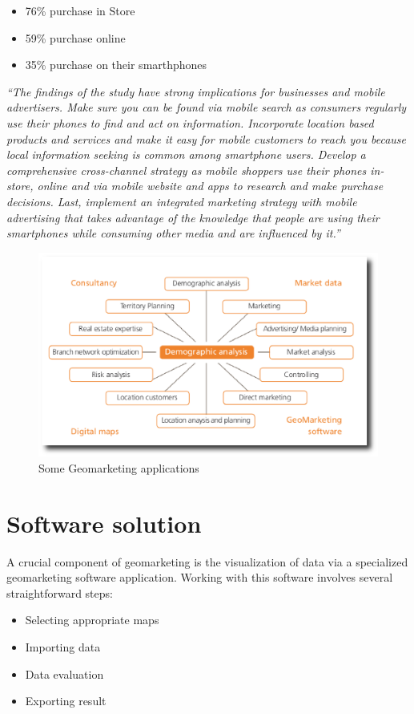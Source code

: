 \begin{itemize}[itemsep=1pt, parsep=1pt]
  \item 76\% purchase in Store
  \item 59\% purchase online
  \item 35\% purchase on their smarthphones
\end{itemize}

\emph{``The findings of the study have strong implications for businesses and
mobile advertisers. Make sure you can be found via mobile search as consumers regularly
use their phones to find and act on information. Incorporate location based
products and services and make it easy for mobile customers to reach you because
local information seeking is common among smartphone users.  Develop a
comprehensive cross-channel strategy as mobile shoppers use their phones
in-store, online and via mobile website and apps to research and make purchase
decisions.  Last, implement an integrated marketing strategy with mobile
advertising that takes advantage of the knowledge that people are using their
smartphones while consuming other media and are influenced by it.''}
\cite{geolocation:geomarketing:google:study}

\pagebreak

\begin{figure}[!htb]
  \begin{center}
  \includegraphics[scale=0.8]{Figures/Geomarketing_application.eps}
  \end{center}
  \caption{Some Geomarketing applications}
  \label{Some Geomarketing applications}
\end{figure}

\section{Software solution}
A crucial component of geomarketing is the visualization of data via a
specialized geomarketing software application. Working with this software
involves several straightforward steps:

\begin{itemize}
  \item Selecting appropriate maps
  \item Importing data
  \item Data evaluation
  \item Exporting result
\end{itemize}